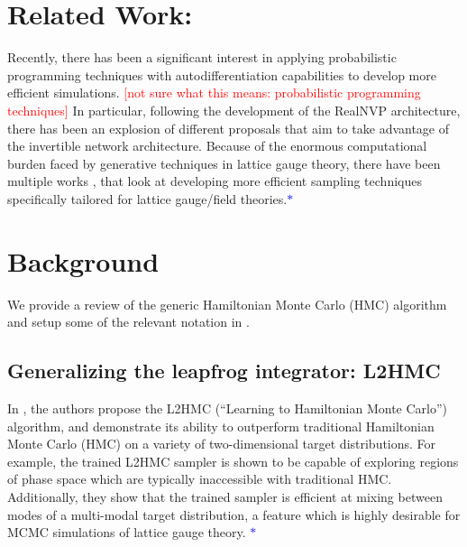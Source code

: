 \documentclass{article} %
\newcommand{\JCO}[1]{\textcolor{red}{[#1]}}
\begin{document}
\section{\label{sec:related_work}Related Work:}
Recently, there has been a significant interest in applying probabilistic programming techniques with
autodifferentiation capabilities to develop more efficient simulations.
\JCO{not sure what this means: probabilistic programming techniques}
%
In particular, following the development of the RealNVP \citep{dinhRealNVP} architecture, there has been an explosion of
different proposals that aim to take advantage of the invertible network architecture.
%
Because of the enormous computational burden faced by generative techniques in lattice gauge theory, there have been
multiple works
\citep{%
   albergo2019flow,albergo2021introduction,favoni2020lattice,medvidovic2020generative,neklyudov2020orbital,
   neklyudov2020involutive, li2020neural,boyda2020sampling,kanwar2020equivariant,toth2019hamiltonian,
   hoffman2019neutra,wehenkel2020you,pasarica2010adaptively, dinhRealNVP,tanaka2017towards,schaefer2009investigating,
   cossu2018testing,rezende2020normalizing%
}, 
that look at developing more efficient sampling techniques specifically tailored for lattice gauge/field
theories.\textcolor{blue}{\(\ast\)}\marginpar{\textcolor{blue}{\(\ast\) Terrible sentence}}
\section{\label{sec:background}Background}
We provide a review of the generic Hamiltonian Monte Carlo (HMC) algorithm and setup some of the relevant notation in
.
%
\subsection{\label{sec:l2hmc}Generalizing the leapfrog integrator: L2HMC}
%
In \citep{levy2017}, the authors propose the L2HMC (``Learning to Hamiltonian Monte Carlo'') algorithm, and demonstrate
its ability to outperform traditional Hamiltonian Monte Carlo (HMC) on a variety of two-dimensional target
distributions.
%
For example, the trained L2HMC sampler is shown to be capable of exploring regions of phase space which are typically
inaccessible with traditional HMC.\@
%
Additionally, they show that the trained sampler is efficient at mixing between modes of a multi-modal target
distribution, a feature which is highly desirable for MCMC simulations of lattice gauge
theory. \textcolor{blue}{\(\ast\)}%
\marginpar{\textcolor{blue}{\(\ast\) combine w/ prev sentence}}
%
\end{document}
